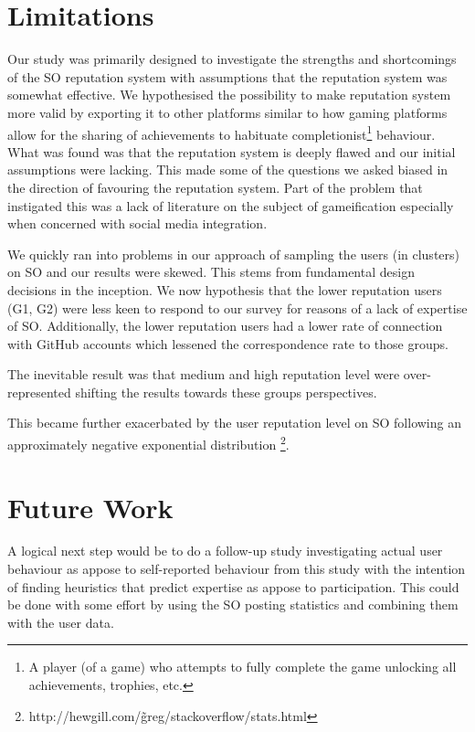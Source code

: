 \documentclass{sigchi}
\begin{document}
\section{Limitations}

Our study was primarily designed to investigate the strengths and shortcomings of the SO reputation system with assumptions that the reputation system was somewhat effective. We hypothesised the possibility to make reputation system more valid by exporting it to other platforms similar to how gaming platforms allow for the sharing of achievements to habituate completionist\footnote{A player (of a game) who attempts to fully complete the game unlocking all achievements, trophies, etc.} behaviour. What was found was that the reputation system is deeply flawed and our initial assumptions were lacking. This made some of the questions we asked biased in the direction of favouring the reputation system. Part of the problem that instigated this was a lack of literature on the subject of gameification especially when concerned with social media integration.

We quickly ran into problems in our approach of sampling the users (in clusters) on SO and our results were skewed. This stems from fundamental design decisions in the inception. We now hypothesis that the lower reputation users (G1, G2) were less keen to respond to our survey for reasons of a lack of expertise of SO. Additionally, the lower reputation users had a lower rate of connection with GitHub accounts which lessened the correspondence rate to those groups.

The inevitable result was that medium and high reputation level were over-represented shifting the results towards these groups perspectives.

This became further exacerbated by the user reputation level on SO following an approximately negative exponential distribution \footnote{http://hewgill.com/\~greg/stackoverflow/stats.html}.



\section{Future Work}

A logical next step would be to do a follow-up study investigating actual user behaviour as appose to self-reported behaviour from this study with the intention of finding heuristics that predict expertise as appose to participation. This could be done with some effort by using the SO posting statistics and combining them with the user data.
\end{document}
